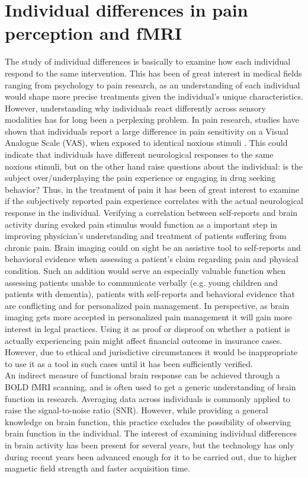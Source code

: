 \section{Individual differences in pain perception and fMRI}
The study of individual differences is basically to examine how each individual respond to the same intervention. This has been of great interest in medical fields ranging from psychology to pain research, as an understanding of each individual would shape more precise treatments given the individual’s unique characteristics. However, understanding why individuals react differently across sensory modalities has for long been a perplexing problem. In pain research, studies have shown that individuals report a large difference in pain sensitivity on a Visual Analogue Scale (VAS), when exposed to identical noxious stimuli \cite{Nielsen2008, Coghill2003}. This could indicate that individuals have different neurological responses to the same noxious stimuli, but on the other hand raise questions about the individual: is the subject over/underplaying the pain experience or engaging in drug seeking behavior? Thus, in the treatment of pain it has been of great interest to examine if the subjectively reported pain experience correlates with the actual neurological response in the individual. \cite{Coghill2011} Verifying a correlation between self-reports and brain activity during evoked pain stimulus would function as a important step in improving physician’s understanding and treatment of patients suffering from chronic pain. Brain imaging could on sight be an assistive tool to self-reports and behavioral evidence when assessing a patient’s claim regarding pain and physical condition. Such an addition would serve an especially valuable function when assessing patients unable to communicate verbally (e.g. young children and patients with dementia), patients with self-reports and behavioral evidence that are conflicting and for personalized pain management. In perspective, as brain imaging gets more accepted in personalized pain management it will gain more interest in legal practices. Using it as proof or disproof on whether a patient is actually experiencing pain might affect financial outcome in insurance cases. However, due to ethical and jurisdictive circumstances it would be inappropriate to use it as a tool in such cases until it has been sufficiently verified. \cite{Davis2017} \\
An indirect measure of functional brain response can be achieved through a BOLD fMRI scanning, and is often used to get a generic understanding of brain function in research. Averaging data across individuals is commonly applied to raise the signal-to-noise ratio (SNR). However, while providing a general knowledge on brain function, this practice excludes the possibility of observing brain function in the individual. The interest of examining individual differences in brain activity has been present for several years, but the technology has only during recent years been advanced enough for it to be carried out, due to higher magnetic field strength and faster acquisition time. \cite{Dubois2016} \\
